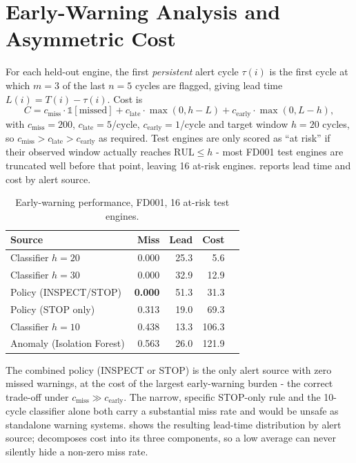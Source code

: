 \documentclass[9pt,a4paper,twocolumn,twoside]{rho-class/rho}
\begin{document}
\section{Early-Warning Analysis and Asymmetric Cost}
\label{sec:earlywarning}
\label{sec:asymcost}

    For each held-out engine, the first \emph{persistent} alert cycle $\tau(i)$ is the first cycle at which $m{=}3$ of the last $n{=}5$ cycles are flagged, giving lead time $L(i) = T(i) - \tau(i)$. Cost is
    \[
        C = c_{\text{miss}} \cdot \mathbb{1}[\text{missed}] + c_{\text{late}} \cdot \max(0, h - L) + c_{\text{early}} \cdot \max(0, L - h),
    \]
    with $c_{\text{miss}}{=}200$, $c_{\text{late}}{=}5$/cycle, $c_{\text{early}}{=}1$/cycle and target window $h{=}20$ cycles, so $c_{\text{miss}} > c_{\text{late}} > c_{\text{early}}$ as required. Test engines are only scored as ``at risk'' if their observed window actually reaches $\mathrm{RUL} \le h$ - most FD001 test engines are truncated well before that point, leaving 16 at-risk engines.  reports lead time and cost by alert source.

    \begin{table}[H]
        \caption{Early-warning performance, FD001, 16 at-risk test engines.}
        \label{tab:earlywarn}
        \begin{tabular}{lrrrr}
        \toprule
        \textbf{Source} & \textbf{Miss} & \textbf{Lead} & \textbf{Cost} \\
        \midrule
        Classifier $h{=}20$ & 0.000 & 25.3 & 5.6 \\
        Classifier $h{=}30$ & 0.000 & 32.9 & 12.9 \\
        Policy (INSPECT/STOP) & \textbf{0.000} & 51.3 & 31.3 \\
        Policy (STOP only) & 0.313 & 19.0 & 69.3 \\
        Classifier $h{=}10$ & 0.438 & 13.3 & 106.3 \\
        Anomaly (Isolation Forest) & 0.563 & 26.0 & 121.9 \\
        \bottomrule
        \end{tabular}
    \end{table}

    The combined policy (INSPECT or STOP) is the only alert source with zero missed warnings, at the cost of the largest early-warning burden - the correct trade-off under $c_{\text{miss}} \gg c_{\text{early}}$. The narrow, specific STOP-only rule and the 10-cycle classifier alone both carry a substantial miss rate and would be unsafe as standalone warning systems.  shows the resulting lead-time distribution by alert source;  decomposes cost into its three components, so a low average can never silently hide a non-zero miss rate.
\end{document}
